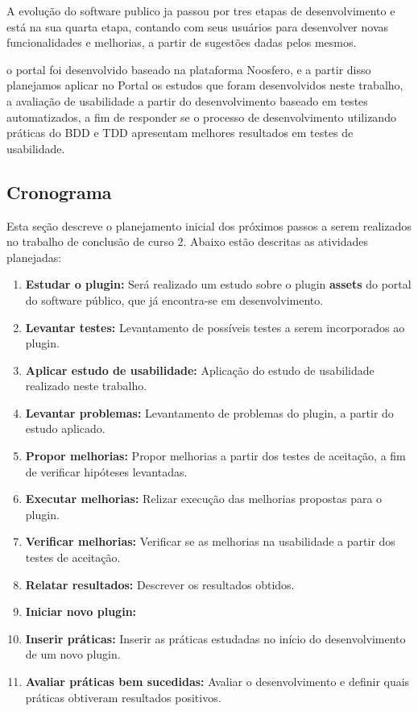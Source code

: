 A evolução do software publico ja passou por tres etapas de desenvolvimento e está na sua quarta etapa, contando com seus usuários para desenvolver novas funcionalidades e melhorias, a partir de sugestões dadas pelos mesmos.

o portal foi desenvolvido baseado na plataforma Noosfero, e a partir disso planejamos aplicar no Portal os estudos que foram desenvolvidos neste trabalho, a avaliação de usabilidade a partir do desenvolvimento baseado em testes automatizados, a fim de responder se o processo de desenvolvimento utilizando práticas do BDD e TDD apresentam melhores resultados em testes de usabilidade.

\subsection{Cronograma}

Esta seção descreve o planejamento inicial dos próximos passos a serem realizados no trabalho de conclusão de curso 2. Abaixo estão descritas as atividades planejadas:

\begin{enumerate}
\item \textbf{Estudar o plugin:} Será realizado um estudo sobre o plugin \textbf{assets} do portal do software público, que já encontra-se em desenvolvimento.
\item \textbf{Levantar testes:} Levantamento de possíveis testes a serem incorporados ao plugin.
\item \textbf{Aplicar estudo de usabilidade:} Aplicação do estudo de usabilidade realizado neste trabalho.
\item \textbf{Levantar problemas:} Levantamento de problemas do plugin, a partir do estudo aplicado.
\item  \textbf{Propor melhorias:} Propor melhorias a partir dos testes de aceitação, a fim de verificar hipóteses levantadas.
\item \textbf{Executar melhorias:} Relizar execução das melhorias propostas para o plugin.
\item \textbf{Verificar melhorias:} Verificar se as melhorias na usabilidade a partir dos testes de aceitação.
\item \textbf{Relatar resultados:} Descrever os resultados obtidos.
\item \textbf{Iniciar novo plugin:} 
\item \textbf{Inserir práticas:} Inserir as práticas estudadas no início do desenvolvimento de um novo plugin.
\item \textbf{Avaliar práticas bem sucedidas:} Avaliar o desenvolvimento e definir quais práticas obtiveram resultados positivos.

\end{enumerate}

